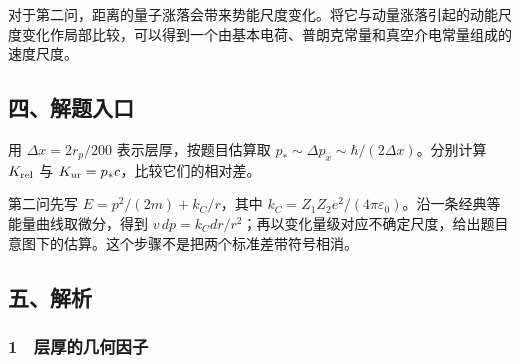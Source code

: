 \documentclass[12pt,a4paper,fontset=fandol]{ctexart}
\begin{document}
对于第二问，距离的量子涨落会带来势能尺度变化。将它与动量涨落引起的动能尺度变化作局部比较，可以得到一个由基本电荷、普朗克常量和真空介电常量组成的速度尺度。

\begin{center}
\begin{minipage}{\linewidth}
\centering\begingroup
{}
\ifdim\wd\diagrambox>.88\linewidth
\sbox{\diagrambox}{\resizebox{.88\linewidth}{!}{\usebox{\diagrambox}}}
\fi
\ifdim\ht\diagrambox>.40\textheight
\resizebox{!}{.40\textheight}{\usebox{\diagrambox}}
\else\usebox{\diagrambox}\fi
\par{}
\endgroup\end{minipage}
\end{center}

\subsection{四、解题入口}\label{ux56dbux89e3ux9898ux5165ux53e3-3}

用 \(\Delta x=2r_p/200\) 表示层厚，按题目估算取
\(p_*\sim\Delta p_x\sim\hbar/(2\Delta x)\)。分别计算 \(K_{\rm rel}\) 与
\(K_{\rm ur}=p_*c\)，比较它们的相对差。

第二问先写 \(E=p^2/(2m)+k_C/r\)，其中
\(k_C=Z_1Z_2e^2/(4\pi\varepsilon_0)\)。沿一条经典等能量曲线取微分，得到
\(v\,dp=k_Cdr/r^2\)；再以变化量级对应不确定尺度，给出题目意图下的估算。这个步骤不是把两个标准差带符号相消。

\subsection{五、解析}\label{ux4e94ux89e3ux6790-3}

\subsubsection{1　层厚的几何因子}\label{ux5c42ux539aux7684ux51e0ux4f55ux56e0ux5b50}
\end{document}
